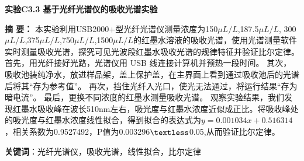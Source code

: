 \documentclass[12pt,a4paper,UTF8]{ctexart}
\begin{document}

\begin{center}
\LARGE\textbf{实验C3.3 基于光纤光谱仪的吸收光谱实验}
\end{center}

\doublespacing
	\vspace{4em}
	{\bf 摘{} 要：}
	{ 本实验利用USB2000+型光纤光谱仪测量浓度为150$\mu L/L$,187.5$\mu L/L$,
	300$\mu L/L$,375$\mu L/L$,750$\mu L/L$,1500$\mu L/L$的红墨水溶液的吸收光谱，使用光谱测量软件实时测量吸收光谱，探究可见光波段红墨水吸收光谱的规律特征并验证比尔定律。
	首先，用光纤接好光路，光谱仪用 USB 线连接计算机并预热一段时间。
	其次，吸收池装纯净水，放进样品架，盖上保护盖，在主界面上看到通过吸收池后的光谱后将其“存为参考值”。
	再次，挡住光纤入光口，使光无法通过，将运行结果“存为暗电流”。
	最后，更换不同浓度的红墨水测量吸收光谱。
	观察实验结果，我们发现红墨水吸收峰在波长510nm左右，吸光度与红墨水浓度近似成正比。将吸收峰处的吸光度与红墨水浓度线性拟合，得到拟合的表达式为$y=0.001034x+0.516314$，相关系数为0.9527492，P值为0.003296$\textless$0.05,从而验证比尔定律。}
	\par%
	\textbf{关键词}：光纤光谱仪，吸收光谱，线性拟合，比尔定律
	\vspace{3em}

\newpage
\end{document}
